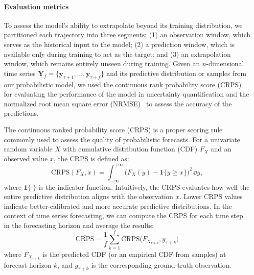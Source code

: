 \documentclass[a4paper,10pt,twocolumn,preprint,3p]{elsarticle}
\begin{document}
\paragraph{Evaluation metrics}
To assess the model’s ability to extrapolate beyond its training distribution, we partitioned each trajectory into three segments: (1) an observation window, which serves as the historical input to the model; (2) a prediction window, which is available only during training to act as the target; and (3) an extrapolation window, which remains entirely unseen during training. Given an $n$-dimensional time series $\mathbf{Y}_f = \{\mathbf{y}_{\tau+1}, \ldots, \mathbf{y}_{\tau+f}\}$ and its predictive distribution or samples from our probabilistic model, we used the continuous rank probability score (CRPS)~\citep{winkler1996scoring} for evaluating the performance of the model in uncertainty quantification and the normalized root mean square error (NRMSE)~\citep{hyndman2006another} to assess the accuracy of the predictions. 

The continuous ranked probability score (CRPS) is a proper scoring rule commonly used to assess the quality of probabilistic forecasts. For a univariate random variable $X$ with cumulative distribution function (CDF) $F_X$ and an observed value $x$, the CRPS is defined as:
\begin{equation}
    \text{CRPS}(F_X, x) = \int_{-\infty}^{+\infty} \bigl(F_X(y) - \mathbf{1}\{y \geq x\}\bigr)^2 \, \dd y,
\end{equation}
where $\mathbf{1}\{\cdot\}$ is the indicator function. Intuitively, the CRPS evaluates how well the entire predictive distribution aligns with the observation $x$. Lower CRPS values indicate better-calibrated and more accurate predictive distributions.
In the context of time series forecasting, we can compute the CRPS for each time step in the forecasting horizon and average the results:
\begin{equation}
    \overline{\text{CRPS}} = \frac{1}{f} \sum_{k=1}^{f} \text{CRPS}\bigl(F_{X_{\tau+k}}, y_{\tau+k}\bigr)
\end{equation}
where $F_{X_{\tau+k}}$ is the predicted CDF (or an empirical CDF from samples) at forecast horizon $k$, and $y_{\tau+k}$ is the corresponding ground-truth observation.
\end{document}
